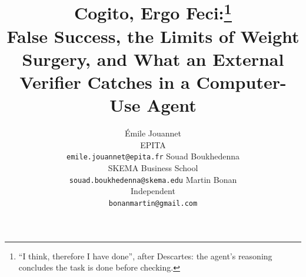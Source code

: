 \newcommand{\subtitleNoLever}{False Success and the Limits of Weight Surgery in a Computer-Use Agent}
\newcommand{\subtitleLever}{Finding and Removing a False-Success Lever in a Computer-Use Agent}
\newcommand{\subtitleVerifier}{False Success, the Limits of Weight Surgery, and What an External Verifier Catches in a Computer-Use Agent}
\newcommand{\subtitleVerifierB}{Weight Surgery Fails to Remove False Success in a Computer-Use Agent, and What an External Verifier Fixes}
\newcommand{\paperSubtitle}{\subtitleVerifier}
\title{Cogito, Ergo Feci:\thanks{``I think, therefore I have done'', after Descartes: the agent's reasoning concludes the task is done before checking.}\\ \paperSubtitle}

\newcommand{\paperAuthors}{%
  \'Emile Jouannet\\ EPITA\\ \texttt{emile.jouannet@epita.fr} \And
  Souad Boukhedenna\\ SKEMA Business School\\ \texttt{souad.boukhedenna@skema.edu} \And
  Martin Bonan\\ Independent\\ \texttt{bonanmartin@gmail.com}}
\author{\paperAuthors}
